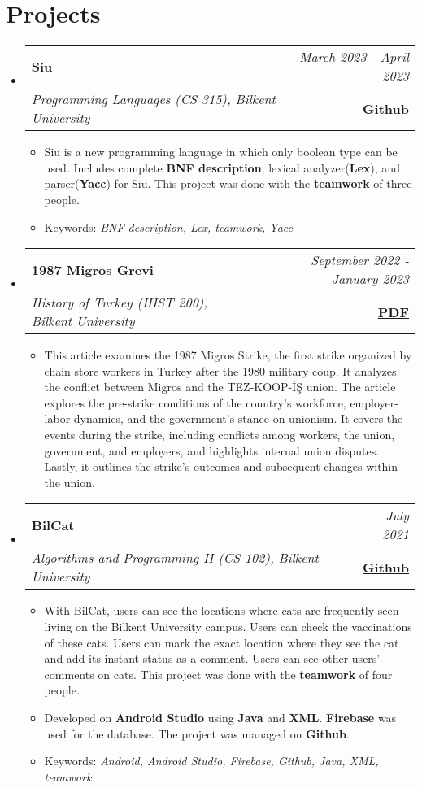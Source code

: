 \documentclass[a4paper,11pt]{article}
\makeatletter
\newcommand{\resumeProject}[4]{
\vspace{0.5mm}\item
    \begin{tabular*}{0.98\textwidth}[t]{l@{\extracolsep{\fill}}r}
    \textbf{#1} & \textit{\footnotesize{#3}} \\
    \footnotesize{\textit{#2}} & \footnotesize{#4}\end{tabular*}\vspace{-2.4mm}
}
\newcommand{\resumeSubHeadingListStart}{\begin{itemize}[leftmargin=*,labelsep=0mm]}
\newcommand{\resumeItemListStart}{\begin{justify}\begin{itemize}[leftmargin=3ex, rightmargin=2ex, noitemsep,labelsep=1.2mm,itemsep=0mm]\small}
\newcommand{\resumeSubHeadingListEnd}{\end{itemize}\vspace{2mm}}
\newcommand{\resumeItemListEnd}{\end{itemize}\end{justify}\vspace{-2mm}}
\makeatother
\begin{document}
\section{\textbf{Projects}}
    \resumeSubHeadingListStart
        \resumeProject
            {Siu} {Programming Languages (CS 315), Bilkent University}
            {March 2023 - April 2023} {\href{https://github.com/memregn/Siu}{\textbf{Github}}}
                \resumeItemListStart
                    \item {Siu is a new programming language in which only boolean type can be used. Includes complete {\textbf{BNF description}}, lexical analyzer({\textbf{Lex}}), and parser({\textbf{Yacc}}) for Siu. This project was done with the {\textbf{teamwork}} of three people.}
                    \item {Keywords: \emph{BNF description, Lex, teamwork, Yacc}}
                \resumeItemListEnd
        \resumeProject
            {1987 Migros Grevi} {History of Turkey (HIST 200), Bilkent University}
            {September 2022 - January 2023} {\href{https://drive.google.com/drive/folders/1G5H6u2htMtbBtiOZKRnt0y9HhukxlCzk?usp=sharing}{\textbf{PDF}}}
                \resumeItemListStart
                    \item {This article examines the 1987 Migros Strike, the first strike organized by chain store workers in Turkey after the 1980 military coup. It analyzes the conflict between Migros and the TEZ-KOOP-İŞ union. The article explores the pre-strike conditions of the country's workforce, employer-labor dynamics, and the government's stance on unionism. It covers the events during the strike, including conflicts among workers, the union, government, and employers, and highlights internal union disputes. Lastly, it outlines the strike's outcomes and subsequent changes within the union.}
                \resumeItemListEnd
        \resumeProject
            {BilCat} {Algorithms and Programming II (CS 102), Bilkent University}
            {July 2021} {\href{https://github.com/memregn/BilCat}{\textbf{Github}}}
                \resumeItemListStart
                    \item {With BilCat, users can see the locations where cats are frequently seen living on the Bilkent University campus. Users can check the vaccinations of these cats. Users can mark the exact location where they see the cat and add its instant status as a comment. Users can see other users' comments on cats. This project was done with the {\textbf{teamwork}} of four people. }
                    \item {Developed on {\textbf{Android Studio}} using {\textbf{Java}} and {\textbf{XML}}. {\textbf{Firebase}} was used for the database. The project was managed on {\textbf{Github}}.}
                    \item {Keywords: \emph{Android, Android Studio, Firebase, Github, Java, XML, teamwork}}
                \resumeItemListEnd
    \resumeSubHeadingListEnd
\vspace{-6.5mm}
\end{document}
